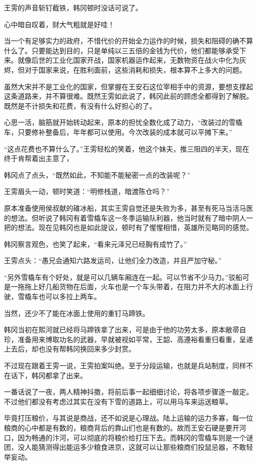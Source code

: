 王雱的声音斩钉截铁，韩冈顿时没话可说了。

心中暗自叹着，财大气粗就是好哇！

当一个有足够实力的政府，不惜代价的开始全力运作的时候，损失和阻碍的确不算什么了。只要能达到目的，只是单纯以三五倍的金钱为代价，他们都能够承受下来。就像后世的工业化国家开战，国家机器运作起来，无数物资在战火中化为灰烬，但对于国家来说，在胜利面前，这些消耗和损失，根本算不上多大的问题。

虽然大宋并不是工业化的国家，但掌握在王安石这位宰相手中的资源，要想支撑起这条道路来，并不算很难。既然王雱如此说了，韩冈此前的顾虑全都得到了解脱。既然是不计损失和花费，有没有什么好担心的了。

心思一活，脑筋就开始转动起来，原本的担忧全数化成了动力，“改装过的雪橇车，只要修补整备后，年年都可以使用。今次改装的成本就可以平摊下来。”

“这点花费也不算什么了。”王雱轻松的笑着，他这个妹夫，推三阻四的半天，现在终于肯帮着出主意了，

韩冈点了点头，“既然如此，不知能不能秘密一点的改装呢？”

王雱眉头一动，顿时笑道：“明修栈道，暗渡陈仓吗？”

原本准备使用侯叔献的碓冰船，其实王雱自觉还是失败为多，甚至有死马当活马医的想法。但听说了韩冈有着雪橇车这一冬季运输队利器，他当时就有了暗中阴人一把的想法。现在见韩冈也是如此提议，顿时有了惺惺相惜，英雄所见略同的感觉。

韩冈察言观色，也笑了起来，“看来元泽兄已经胸有成竹了。”

王雱点头：“愚兄会通知六路发运司，让他们全力改造，并且严加守秘。”

“另外雪橇车有个好处，就是可以几辆车厢连在一起。可以节省不少马力。”驳船可是一拖拖上好几船货物在后面，火车也是一个车头带着，在阻力并不大的冰面上行驶，雪橇车也可以多拉上两车。

当然，还少不了能在冰面上使用的重钉马蹄铁。

韩冈当初在熙河就已经将马蹄铁拿了出来，可是由于他的功劳太多，原本敝帚自珍，准备用来博取功名的武器，早就被视如平常，王韶、高遵裕看重归看重，呈递上去后，却也没有帮韩冈换回来多少封赏。

不过现在跟着王雱一说，王雱拍案叫绝。至于分段运输，也就是兵站制度，同样不在话下，韩冈都拿了出来。

一番话说了一夜，两人精神抖擞，将前后事一起细细讨论，将各项步骤逐一敲定。不过他们都没有考虑过其实在没有下雪的道路上，可以用马车来运送粮草。

毕竟打压粮价，与其说是商战，还不如说是心理战。陆上运输的运力多寡，每一位粮商的心中都是有数的，粮商背后的靠山们也是有数的。故而王安石硬是要开河口，因为畅通的汴河，可以彻底的将粮价给打压下去。而韩冈的雪橇车则是一个谜团，没人能猜测得出能运多少粮食进京，这就可以让那些粮商们投鼠忌器，不敢轻举妄动。

